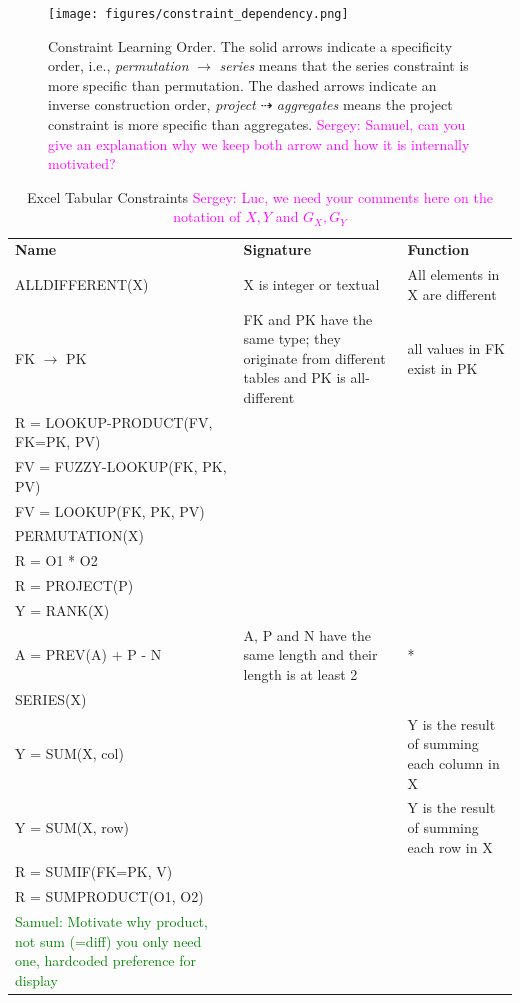 \documentclass{ecai}
\newcommand{\sergey}[1]{\textcolor{magenta}{{\sc Sergey:} #1}\xspace}
\newcommand{\samuel}[1]{\textcolor{green}{{\sc Samuel:} #1}\xspace}
\newcommand{\format}[1]{\textit{#1}\xspace}
\newcommand{\CName}{Name\xspace}
\newcommand{\CSignature}{Signature\xspace}
\newcommand{\CFunction}{Function\xspace}
\begin{document}
\begin{figure}[htb]
  \centering
  \texttt{[image: figures/constraint\_dependency.png]}
  \caption{Constraint Learning Order. The solid arrows indicate a specificity order, i.e., \textit{permutation} $\rightarrow$ \textit{series} means that the series constraint is more specific than permutation. The dashed arrows indicate an inverse construction order, \textit{project} $\dashrightarrow$ \textit{aggregates} means the project constraint is more specific than aggregates. \sergey{Samuel,  can you give an explanation why we keep both arrow and how it is internally motivated?}}
  \label{fig:learning_order}
\end{figure}


\newcommand{\numeric}{\format{numeric}}
\newcommand{\textual}{\format{textual}}
\newcommand{\integer}{\format{integer}}
\newcommand{\length}{\format{length}}
\newcommand{\nat}{\mathcal{N}}

\begin{table}
  \centering
  \begin{tabularx}{\textwidth}{XXX}
    \textbf{\CName} & \textbf{\CSignature} & \textbf{\CFunction}\\
    ALLDIFFERENT(X) & X is integer or textual & All elements in X are different \\
    FK $\rightarrow$ PK & FK and PK have the same type; they originate from different tables and PK is all-different & all values in FK exist in PK \\
    R = LOOKUP-PRODUCT(FV, FK=PK, PV) & & \\
    FV = FUZZY-LOOKUP(FK, PK, PV) & & \\
    FV = LOOKUP(FK, PK, PV) & & \\
    PERMUTATION(X) & & \\
    R = O1 * O2 & & \\
    R = PROJECT(P) & & \\
     Y = RANK(X) & & \\
    A = PREV(A) + P - N & A, P and N have the same length and their length is at least 2 & *\\
    SERIES(X) & & \\
    Y = SUM(X, col) & & Y is the result of summing each column in X \\
    Y = SUM(X, row) & & Y is the result of summing each row in X \\
    R = SUMIF(FK=PK, V) & & \\
    R = SUMPRODUCT(O1, O2) & & \\

\samuel{Motivate why product, not sum (=diff) you only need one, hardcoded preference for display}

  \end{tabularx}
  \caption{Excel Tabular Constraints \sergey{Luc, we need your comments here on the notation of $X,Y$ and $G_X,G_Y$}}
  \label{table:constraints}
\end{table}
\end{document}
